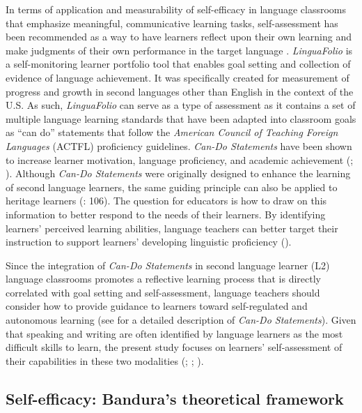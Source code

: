\documentclass[output=paper]{langscibook}
\begin{document}
In terms of application and measurability of self-efficacy in language classrooms that emphasize meaningful, communicative learning tasks, self-as\-sess\-ment has been recommended as a way to have learners reflect upon their own learning and make judgments of their own performance in the target language \citep{Klein2007}. \textit{LinguaFolio} is a self-monitoring learner portfolio tool that enables goal setting and collection of evidence of language achievement. It was specifically created for measurement of progress and growth in second languages other than English in the context of the U.S. As such, \textit{LinguaFolio} can serve as a type of assessment as it contains a set of multiple language learning standards that have been adapted into classroom goals as “can do” statements that follow the \textit{American Council of Teaching Foreign Languages} (ACTFL) proficiency guidelines. \textit{Can-Do Statements} have been shown to increase learner motivation, language proficiency, and academic achievement (\citealt{CollettSullivan2010}; \citealt{MoellerWu2012}). Although \textit{Can-Do Statements} were originally designed to enhance the learning of second language learners, the same guiding principle can also be applied to heritage learners (\citealt{CoxWinke2018}: 106). The question for educators is how to draw on this information to better respond to the needs of their learners. By identifying learners’ perceived learning abilities, language teachers can better target their instruction to support learners’ developing linguistic proficiency (\citealt[49]{Hlas2018}).

Since the integration of \textit{Can-Do Statements} in second language learner (L2) language classrooms promotes a reflective learning process that is directly correlated with goal setting and self-assessment, language teachers should consider how to provide guidance to learners toward self-regulated and autonomous learning (see \citealt{MoellerYu2015} for a detailed description of \textit{Can-Do Statements}). Given that speaking and writing are often identified by language learners as the most difficult skills to learn, the present study focuses on learners’ self-assessment of their capabilities in these two modalities (\citealt{Aida1994}; \citealt{ChengHorwitzSchallert1999}; \citealt{Phillips1992}).


\subsection{{Self-efficacy: Bandura’s theoretical framework}}
\end{document}
